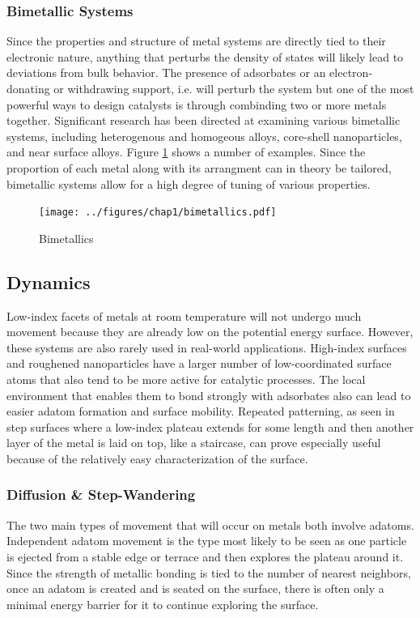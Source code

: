 \subsubsection{Bimetallic Systems}
Since the properties and structure of metal systems are directly tied to their
electronic nature, anything that perturbs the density of states will likely
lead to deviations from bulk behavior. The presence of adsorbates or an
electron-donating or withdrawing support, i.e.  will perturb the
system but one of the most powerful ways to design catalysts is through
combinding two or more metals together. Significant research has been directed
at examining various bimetallic systems, including heterogenous and homogeous
alloys, core-shell nanoparticles, and near surface alloys. Figure
\ref{fig:bimetallics} shows a number of examples. Since the proportion of each
metal along with its arrangment can in theory be tailored, bimetallic systems
allow for a high degree of tuning of various properties.

\begin{figure}
  \texttt{[image: ../figures/chap1/bimetallics.pdf]}
  \caption{Bimetallics}
\label{fig:bimetallics}
\end{figure}

\subsection{Dynamics}
Low-index facets of metals at room temperature will not undergo much movement
because they are already low on the potential energy surface. However, these
systems are also rarely used in real-world applications. High-index surfaces
and roughened nanoparticles have a larger number of low-coordinated surface
atoms that also tend to be more active for catalytic processes. The local
environment that enables them to bond strongly with adsorbates also can lead to
easier adatom formation and surface mobility. Repeated patterning, as seen in
step surfaces where a low-index plateau extends for some length and then
another layer of the metal is laid on top, like a staircase, can prove
especially useful because of the relatively easy characterization of the
surface.

\subsubsection{Diffusion \& Step-Wandering}
The two main types of movement that will occur on metals both involve adatoms.
Independent adatom movement is the type most likely to be seen as one particle
is ejected from a stable edge or terrace and then explores the plateau around
it. Since the strength of metallic bonding is tied to the number of nearest
neighbors, once an adatom is created and is seated on the surface, there is
often only a minimal energy barrier for it to continue exploring the surface. 

